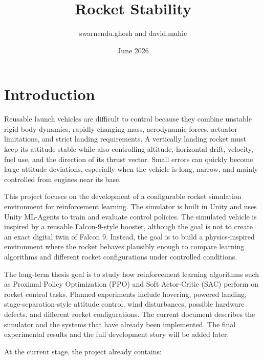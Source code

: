 \documentclass{article}
\title{Rocket Stability}
\author{swarnendu.ghosh and david.muhic}
\date{June 2026}
\begin{document}
\maketitle

\section{Introduction}

Reusable launch vehicles are difficult to control because they combine unstable rigid-body dynamics, rapidly changing mass, aerodynamic forces, actuator limitations, and strict landing requirements. A vertically landing rocket must keep its attitude stable while also controlling altitude, horizontal drift, velocity, fuel use, and the direction of its thrust vector. Small errors can quickly become large attitude deviations, especially when the vehicle is long, narrow, and mainly controlled from engines near its base.

This project focuses on the development of a configurable rocket simulation environment for reinforcement learning. The simulator is built in Unity and uses Unity ML-Agents to train and evaluate control policies. The simulated vehicle is inspired by a reusable Falcon-9-style booster, although the goal is not to create an exact digital twin of Falcon 9. Instead, the goal is to build a physics-inspired environment where the rocket behaves plausibly enough to compare learning algorithms and different rocket configurations under controlled conditions.

The long-term thesis goal is to study how reinforcement learning algorithms such as Proximal Policy Optimization (PPO) and Soft Actor-Critic (SAC) perform on rocket control tasks. Planned experiments include hovering, powered landing, stage-separation-style attitude control, wind disturbances, possible hardware defects, and different rocket configurations. The current document describes the simulator and the systems that have already been implemented. The final experimental results and the full development story will be added later.

At the current stage, the project already contains:
\end{document}

